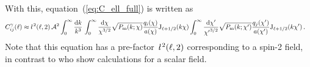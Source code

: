\documentclass[fleqn,usenatbib]{mnras} %
\newcommand{\ellbar}{\hbox{\it \l}\,}
\newcommand{\pref}{{\cal A}}
\begin{document}
With this, equation~(\ref{eq:C_ell_full}) is written as
%
\begin{align}
  C^\gamma_{ij}(\ell) \approx & \, \ellbar^2(\ell, 2) \, \pref^2
                \int_0^\infty \frac{{\rm d} k}{k^3} \,
                \int_{0}^\infty \frac{{\rm d} \chi}{\chi^{3/2}} \sqrt{P_{\rm m}(k; \chi)}
                \frac{q_i(\chi)}{a(\chi)} {\rm J}_{\ell+1/2}(k \chi)
                \int_{0}^\infty \frac{{\rm d} \chi^\prime}{{\chi^\prime}^{3/2}}
                \sqrt{P_{\rm m}(k; \chi^\prime)} \frac{q_j(\chi^\prime)}{a(\chi^\prime)} {\rm J}_{\ell+1/2}(k \chi^\prime) \, .
  \label{eq:C_ell_full_Pk}
\end{align}
%
Note that this equation has a pre-factor $\ellbar^2(\ell, 2)$ corresponding to a spin-2 field, in contrast
to \cite{2008PhRvD..78l3506L} who show calculations for a scalar field.
\end{document}
